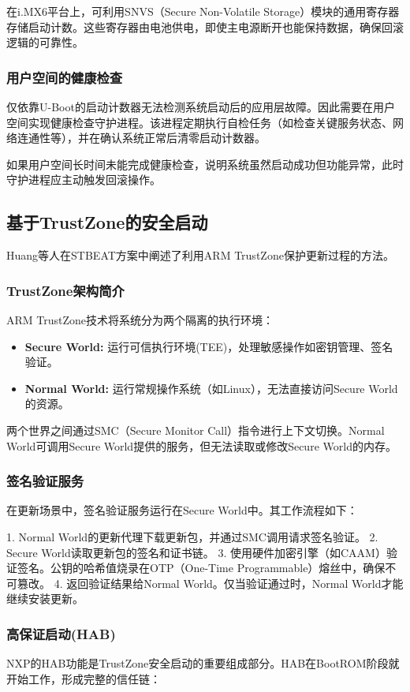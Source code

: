 \documentclass[a4paper,12pt]{article}
\begin{document}
在i.MX6平台上，可利用SNVS（Secure Non-Volatile Storage）模块的通用寄存器存储启动计数。这些寄存器由电池供电，即使主电源断开也能保持数据，确保回滚逻辑的可靠性。

\subsubsection{用户空间的健康检查}
仅依靠U-Boot的启动计数器无法检测系统启动后的应用层故障。因此需要在用户空间实现健康检查守护进程。该进程定期执行自检任务（如检查关键服务状态、网络连通性等），并在确认系统正常后清零启动计数器。

如果用户空间长时间未能完成健康检查，说明系统虽然启动成功但功能异常，此时守护进程应主动触发回滚操作。

\subsection{基于TrustZone的安全启动}
Huang等人在STBEAT方案中阐述了利用ARM TrustZone保护更新过程的方法\cite{Huang2022}。

\subsubsection{TrustZone架构简介}
ARM TrustZone技术将系统分为两个隔离的执行环境：
\begin{itemize}
    \item \textbf{Secure World:} 运行可信执行环境(TEE)，处理敏感操作如密钥管理、签名验证。
    \item \textbf{Normal World:} 运行常规操作系统（如Linux），无法直接访问Secure World的资源。
\end{itemize}

两个世界之间通过SMC（Secure Monitor Call）指令进行上下文切换。Normal World可调用Secure World提供的服务，但无法读取或修改Secure World的内存。

\subsubsection{签名验证服务}
在更新场景中，签名验证服务运行在Secure World中。其工作流程如下：

1. Normal World的更新代理下载更新包，并通过SMC调用请求签名验证。
2. Secure World读取更新包的签名和证书链。
3. 使用硬件加密引擎（如CAAM）验证签名。公钥的哈希值烧录在OTP（One-Time Programmable）熔丝中，确保不可篡改。
4. 返回验证结果给Normal World。仅当验证通过时，Normal World才能继续安装更新。

\subsubsection{高保证启动(HAB)}
NXP的HAB功能是TrustZone安全启动的重要组成部分。HAB在BootROM阶段就开始工作，形成完整的信任链：
\end{document}
